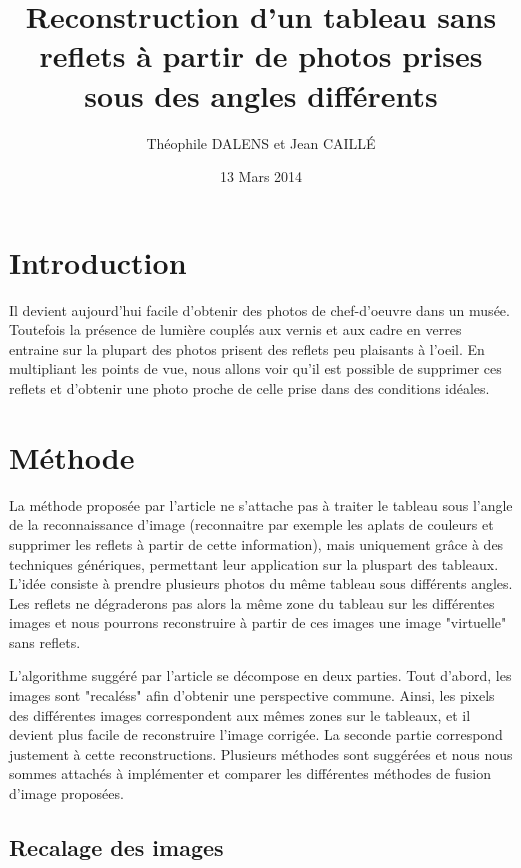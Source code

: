 \documentclass[12pt,a4paper]{article}
\title{Reconstruction d'un tableau sans reflets à partir de photos prises sous des angles différents}
\date{13 Mars 2014}
\author{Théophile DALENS et Jean CAILLÉ}
\begin{document}
\maketitle

\section{Introduction}
Il devient aujourd'hui facile d'obtenir des photos de chef-d'oeuvre dans un musée. Toutefois la présence de lumière couplés aux vernis et aux cadre en verres entraine sur la plupart des photos prisent des reflets peu plaisants à l'oeil. En multipliant les points de vue, nous allons voir qu'il est possible de supprimer ces reflets et d'obtenir une photo proche de celle prise dans des conditions idéales.

\section{Méthode}

La méthode proposée par l'article ne s'attache pas à traiter le tableau sous l'angle de la reconnaissance d'image (reconnaitre par exemple les aplats de couleurs et supprimer les reflets à partir de cette information), mais uniquement grâce à des techniques génériques, permettant leur application sur la pluspart des tableaux. L'idée consiste à prendre plusieurs photos du même tableau sous différents angles. Les reflets ne dégraderons pas alors la même zone du tableau sur les différentes images et nous pourrons reconstruire à partir de ces images une image "virtuelle" sans reflets.

L'algorithme suggéré par l'article se décompose en deux parties. Tout d'abord, les images sont "recaléss" afin d'obtenir une perspective commune. Ainsi, les pixels des différentes images correspondent aux mêmes zones sur le tableaux, et il devient plus facile de reconstruire l'image corrigée. La seconde partie correspond justement à cette reconstructions. Plusieurs méthodes sont suggérées et nous nous sommes attachés à implémenter et comparer les différentes méthodes de fusion d'image proposées.

\subsection{Recalage des images}
\end{document}
